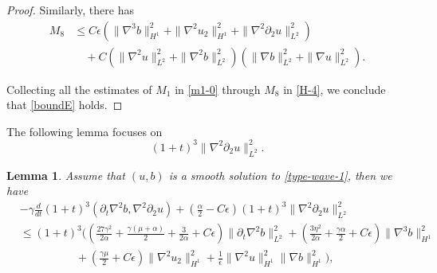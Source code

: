 \documentclass[reqno,11pt]{amsart}
\newtheorem{Lem}[Thm]{Lemma}
\numberwithin{Thm}{section}
\begin{document}
\begin{proof}
Similarly, there has
\begin{align}\label{H-4}
M_8&\leq C\epsilon(\|\nabla^3b\|_{H^1}^2+\|\nabla^2u_2\|_{H^1}^2+\|\nabla^2\partial_2u\|_{L^2}^2)\nonumber\\
&\quad+C(\|\nabla^2 u\|_{L^2}^2+\|\nabla^2 b\|_{L^2}^2)(\|\nabla b\|_{L^2}^2+\|\nabla u\|_{L^2}^2).
\end{align}



Collecting all the estimates of $M_1$ in \eqref{m1-0} through $M_8$ in \eqref{H-4}, we conclude that \eqref{boundE} holds.
\end{proof}




The following lemma focuses on $$(1+t)^3\|\nabla^2\partial_2u\|_{L^2}^2.$$
\begin{Lem}\label{keyy1}
Assume that $(u,b)$ is a smooth solution to \eqref{type-wave-1}, then we have
\begin{align}\label{keyE}
&-\gamma\frac{d}{dt}(1+t)^3(\partial_t\nabla^2b,\nabla^2\partial_2u)+(\frac{\alpha}{2}-C\epsilon)(1+t)^3\|\nabla^2\partial_2u\|_{L^2}^2\nonumber\\
& \leq(1+t)^3\Big((\frac{27\gamma^2}{2\alpha}+\frac{\gamma(\mu+\alpha)}{2}+\frac{3}{2\alpha}+C\epsilon)\|\partial_t \nabla^2 b\|_{L^2}^2+ (\frac{3\eta^2}{2\alpha}+\frac{\gamma\alpha}{2}+C\epsilon)\|\nabla^3 b\|_{H^1}^2\nonumber\\
&\quad\qquad\qquad+(\frac{\gamma\mu}{2}+C\epsilon)\|\nabla^2u_2\|_{H^1}^2+\frac{1}{\epsilon}\|\nabla^2 u\|_{H^{1}}^2\|\nabla b\|_{H^{1}}^2\Big),
\end{align}
\end{Lem}
\end{document}
